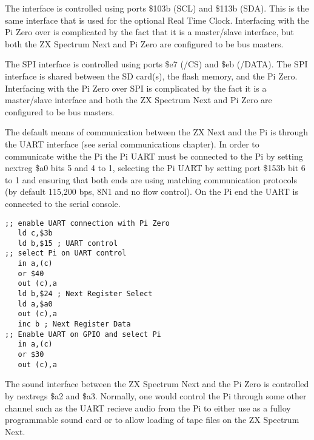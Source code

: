 

The \iic interface is controlled using ports \$103b (SCL) and \$113b
(SDA). This is the same \iic interface that is used for the optional
Real Time Clock. Interfacing with the Pi Zero over \iic is
complicated by the fact that it is a master/slave interface, but both
the ZX Spectrum Next and Pi Zero are configured to be bus masters.




The SPI interface is controlled using ports \$e7 (/CS) and \$eb
(/DATA). The SPI interface is shared between the SD card(s), the flash
memory, and the Pi Zero. Interfacing with the Pi Zero over SPI is
complicated by the fact it is a master/slave interface and both the ZX
Spectrum Next and Pi Zero are configured to be bus masters.




The default means of communication between the ZX Next and the Pi is
through the UART interface (see serial communications chapter). In
order to communicate withe the Pi the Pi UART must be connected to the
Pi by setting nextreg \$a0 bits 5 and 4 to 1, selecting the Pi UART by
setting port \$153b bit 6 to 1 and ensuring that both ends are using
matching communication protocols (by default 115,200 bps, 8N1 and no
flow control). On the Pi end the UART is connected to the serial
console.

\begin{verbatim}
;; enable UART connection with Pi Zero
   ld c,$3b
   ld b,$15 ; UART control
;; select Pi on UART control
   in a,(c)
   or $40
   out (c),a
   ld b,$24 ; Next Register Select
   ld a,$a0
   out (c),a
   inc b ; Next Register Data
;; Enable UART on GPIO and select Pi
   in a,(c)
   or $30
   out (c),a
\end{verbatim}

The \iis sound interface between the ZX Spectrum Next and the Pi Zero
is controlled by nextregs \$a2 and \$a3. Normally, one would control
the Pi through some other channel such as the UART recieve audio from
the Pi to either use as a fulloy programmable sound card or to allow
loading of tape files on the ZX Spectrum Next.



